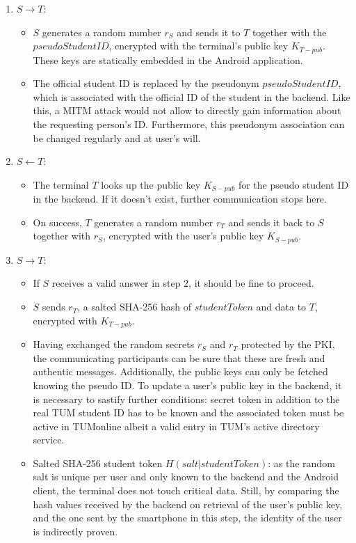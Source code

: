 \begin{enumerate}
	\item $ S \rightarrow T $:
	\begin{itemize}
		\item $ S $ generates a random number $ r_S $ and sends it to $ T $ together with the $ pseudoStudentID $, encrypted with the terminal's public key $ K_{T-pub} $. These keys are statically embedded in the Android application.
		\item The official student ID is replaced by the pseudonym $ pseudoStudentID $, which is associated with the official ID of the student in the backend.
		Like this, a MITM attack would not allow to directly gain information about the requesting person's ID.
		Furthermore, this pseudonym association can be changed regularly and at user's will.
	\end{itemize}	
	\item $ S \leftarrow T $:
	\begin{itemize}
		\item The terminal $ T $ looks up the public key $ K_{S-pub} $ for the pseudo student ID in the backend. If it doesn't exist, further communication stops here.
		\item On success, $ T $ generates a random number $ r_T $ and sends it back to $ S $ together with $ r_S $, encrypted with the user's public key $ K_{S-pub} $.
	\end{itemize}	
	\item $ S \rightarrow T $:
	\begin{itemize}
		\item If $ S $ receives a valid answer in step 2, it should be fine to proceed.
		\item $ S $ sends $ r_T $, a salted SHA-256 hash of $ studentToken $ and data to $ T $, encrypted with $ K_{T-pub} $.
		\item Having exchanged the random secrets $ r_S $ and $ r_T $ protected by the PKI, the communicating participants can be sure that these are fresh and authentic messages. Additionally, the public keys can only be fetched knowing the pseudo ID. To update a user's public key in the backend, it is necessary to sastify further conditions: secret token in addition to the real TUM student ID has to be known and the associated token must be active in TUMonline albeit a valid entry in TUM's active directory service.
		\item Salted SHA-256 student token $ H(salt|studentToken) $: as the random salt is unique per user and only known to the backend and the Android client, the terminal does not touch critical data.
		Still, by comparing the hash values received by the backend on retrieval of the user's public key, and the one sent by the smartphone in this step, the identity of the user is indirectly proven.
	\end{itemize}
\end{enumerate}